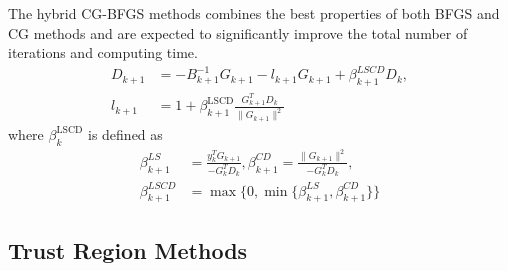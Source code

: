 \documentclass[aps,prl,reprint,amsmath,amssymb]{revtex4-1}
\begin{document}
The hybrid CG-BFGS methods combines the best properties of both BFGS and CG methods and are expected to significantly improve the total number of iterations and computing time. 
%
\begin{equation} \label{eq:hybrid_dir}
\begin{split}
D_{k+1} &= -B_{k+1}^{-1}G_{k+1} - l_{k+1}G_{k+1} + \beta_{k+1}^{LSCD}D_{k}, \\
l_{k+1} &= 1 + \beta_{k+1}^\text{LSCD}\frac{G_{k+1}^{T}D_{k}}{\lVert G_{k+1}\rVert^{2}}
\end{split}
\end{equation}
%
where $\beta_{k}^\text{LSCD}$ is defined as 
%
\begin{equation} \label{eq:beta_LSCD}
\begin{split}
\beta_{k+1}^{LS} &= \frac{y_{k}^{T}G_{k+1}}{-G_{k}^{T}D_{k}}, \beta_{k+1}^{CD} = \frac{\lVert G_{k+1}\rVert^2}{-G_{k}^{T}D_{k}}, \\
\beta_{k+1}^{LSCD} &= \max\Big\{0, \min\Big\{\beta_{k+1}^{LS}, \beta_{k+1}^{CD}\Big\}\Big\}
\end{split}
\end{equation}
%

\subsection{Trust Region Methods}
\end{document}
